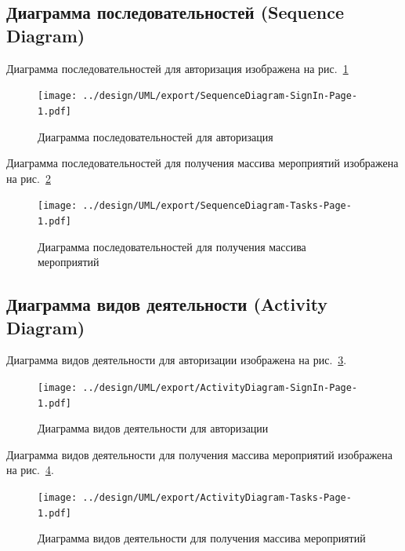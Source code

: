 \newpage
\subsection{Диаграмма последовательностей (Sequence Diagram)}

Диаграмма последовательностей для авторизация изображена на рис.~\ref{fig:SequenceDiagramSignIn}

\begin{figure}[!h]
  \centering

  \texttt{[image: ../design/UML/export/SequenceDiagram-SignIn-Page-1.pdf]}

  \caption{Диаграмма последовательностей для авторизация}
  \label{fig:SequenceDiagramSignIn}
\end{figure}

Диаграмма последовательностей для получения массива мероприятий изображена на рис.~\ref{fig:SequenceDiagramTasks}

\begin{figure}[!h]
  \centering

  \texttt{[image: ../design/UML/export/SequenceDiagram-Tasks-Page-1.pdf]}

  \caption{Диаграмма последовательностей для получения массива мероприятий}
  \label{fig:SequenceDiagramTasks}
\end{figure}


\newpage
\subsection{Диаграмма видов деятельности (Activity Diagram)}

Диаграмма видов деятельности для авторизации изображена на рис.~\ref{fig:ActivityDiagramSignIn}.

\begin{figure}[!h]
  \centering

  \texttt{[image: ../design/UML/export/ActivityDiagram-SignIn-Page-1.pdf]}

  \caption{Диаграмма видов деятельности для авторизации}
  \label{fig:ActivityDiagramSignIn}
\end{figure}

\newpage
Диаграмма видов деятельности для получения массива мероприятий изображена на рис.~\ref{fig:ActivityDiagramTasks}.

\begin{figure}[!h]
  \centering

  \texttt{[image: ../design/UML/export/ActivityDiagram-Tasks-Page-1.pdf]}

  \caption{Диаграмма видов деятельности для получения массива мероприятий}
  \label{fig:ActivityDiagramTasks}
\end{figure}


